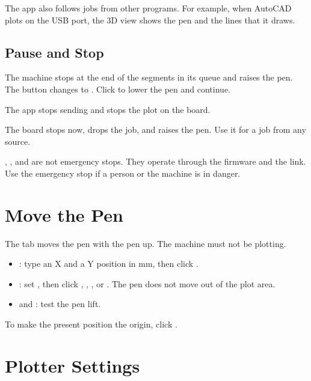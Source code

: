 The app also follows jobs from other programs. For example, when AutoCAD
plots on the USB port, the 3D view shows the pen and the lines that it draws.

\subsection{Pause and Stop}

\begin{description}[style=nextline,leftmargin=1.2em,font=\sffamily\bfseries\color{navy}]
  \item[Pause] The machine stops at the end of the segments in its queue and
        raises the pen. The button changes to . Click
         to lower the pen and continue.
  \item[Stop] The app stops sending and stops the plot on the board.
  \item[Abort] The board stops now, drops the job, and raises the pen. Use
        it for a job from any source.
\end{description}

\begin{warning}
, , and  are not emergency stops. They
operate through the firmware and the link. Use the emergency stop if a person
or the machine is in danger.
\end{warning}

\section{Move the Pen}

The  tab moves the pen with the pen up. The machine must not be
plotting.

\begin{itemize}
  \item {}: type an X and a Y position in mm, then click
        .
  \item {}: set , then click , ,
        , or . The pen does not move out of the plot area.
  \item {} and : test the pen lift.
\end{itemize}

To make the present position the origin, click .

\section{Plotter Settings}\label{sec:app-settings}

